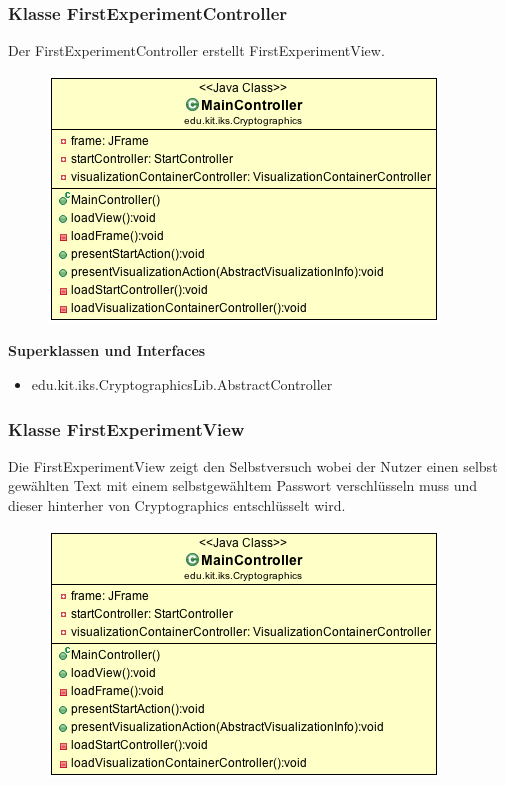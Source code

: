 \documentclass{article}
\begin{document}
    \subsubsection{Klasse FirstExperimentController}
      Der FirstExperimentController erstellt FirstExperimentView.
      \begin{figure}[H]
        \centering
        \includegraphics[width=\textwidth]{resources/edu-kit-iks-Cryptographics-MainController}
      \end{figure}

      \textbf{Superklassen und Interfaces}
      \begin{itemize}
        \item edu.kit.iks.CryptographicsLib.AbstractController
      \end{itemize}

    \subsubsection{Klasse FirstExperimentView}
      Die FirstExperimentView zeigt den Selbstversuch wobei der Nutzer einen selbst gewählten Text mit einem selbstgewähltem Passwort verschlüsseln muss und dieser hinterher von Cryptographics entschlüsselt wird.
      \begin{figure}[H]
        \centering
        \includegraphics[width=\textwidth]{resources/edu-kit-iks-Cryptographics-MainController}
      \end{figure}
\end{document}
